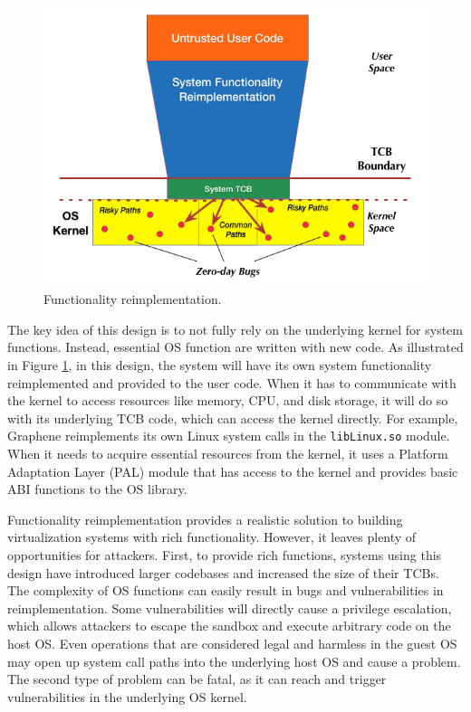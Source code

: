  
\begin{figure}%
\centering
\includegraphics[width=1.0\columnwidth]{diagram/Virtualization_Design_Model_02.png}
\caption{\small Functionality reimplementation.}
\label{fig:design_functionality_reimplementation}
\end{figure}

The key idea of this design is to not fully rely on the underlying
kernel for system functions. Instead, essential OS function are written with new
code. As illustrated in Figure \ref{fig:design_functionality_reimplementation},
in this design, the system will have its own system functionality reimplemented and
provided to the user code. When it has to communicate with the kernel
to access resources like memory, CPU, and disk storage, it will do so with
its underlying TCB code, which can access the kernel directly.
For example, Graphene \cite{Graphene-14} reimplements
its own Linux system calls in the
\texttt{libLinux.so} module. When it needs to acquire essential resources from
the kernel, it uses a
Platform Adaptation Layer (PAL)  module that has access to the kernel
and provides basic ABI functions to the OS library.

Functionality reimplementation provides a
realistic solution to building virtualization systems
with rich functionality. However, it 
leaves plenty of opportunities for attackers.
First, to provide rich functions, systems using this design have
introduced larger codebases and increased the size of their TCBs.
The complexity of OS functions can easily result in bugs and vulnerabilities in
reimplementation. Some vulnerabilities
will directly cause a privilege escalation, which allows attackers to escape the sandbox
and execute arbitrary code on the host OS.
Even operations that are considered
legal and harmless in the guest OS may open up system call paths into the underlying
host OS and cause a problem.
The second type of problem can be fatal, as it can reach and
trigger vulnerabilities in the underlying OS kernel.

